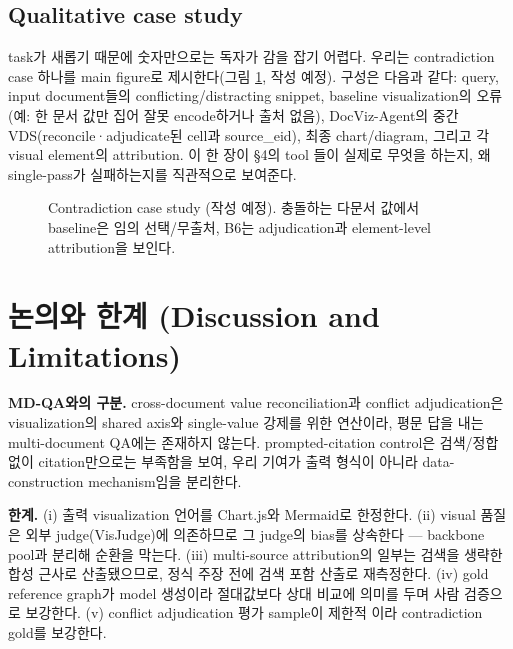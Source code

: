 \documentclass[11pt]{article}
\begin{document}
\subsection{Qualitative case study}
\label{sec:case}

task가 새롭기 때문에 숫자만으로는 독자가 감을 잡기 어렵다. 우리는 contradiction case 하나를
main figure로 제시한다(그림 \ref{fig:case}, 작성 예정). 구성은 다음과 같다: query, input
document들의 conflicting/distracting snippet, baseline visualization의 오류(예: 한 문서 값만
집어 잘못 encode하거나 출처 없음), DocViz-Agent의 중간 VDS(reconcile·adjudicate된 cell과
source\_eid), 최종 chart/diagram, 그리고 각 visual element의 attribution. 이 한 장이 §4의 tool
들이 실제로 무엇을 하는지, 왜 single-pass가 실패하는지를 직관적으로 보여준다.

\begin{figure}[h]
\centering
{}
\caption{Contradiction case study (작성 예정). 충돌하는 다문서 값에서 baseline은 임의 선택/무출처,
B6는 adjudication과 element-level attribution을 보인다.}
\label{fig:case}
\end{figure}

\section{논의와 한계 (Discussion and Limitations)}

\textbf{MD-QA와의 구분.} cross-document value reconciliation과 conflict adjudication은
visualization의 shared axis와 single-value 강제를 위한 연산이라, 평문 답을 내는 multi-document
QA에는 존재하지 않는다. prompted-citation control은 검색/정합 없이 citation만으로는 부족함을
보여, 우리 기여가 출력 형식이 아니라 data-construction mechanism임을 분리한다.

\textbf{한계.} (i) 출력 visualization 언어를 Chart.js와 Mermaid로 한정한다. (ii) visual 품질은
외부 judge(VisJudge)에 의존하므로 그 judge의 bias를 상속한다 — backbone pool과 분리해 순환을
막는다. (iii) multi-source attribution의 일부는 검색을 생략한 합성 근사로 산출됐으므로, 정식
주장 전에 검색 포함 산출로 재측정한다. (iv) gold reference graph가 model 생성이라 절대값보다
상대 비교에 의미를 두며 사람 검증으로 보강한다. (v) conflict adjudication 평가 sample이 제한적
이라 contradiction gold를 보강한다.
\end{document}
